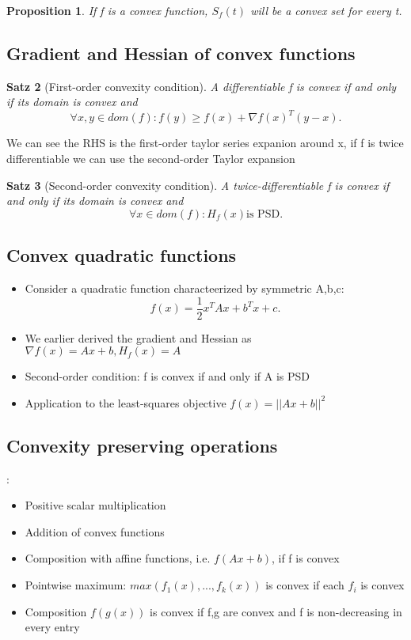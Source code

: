 \documentclass[11pt]{article}
\newtheorem{theorem}{Satz}
\newtheorem{proposition}[theorem]{Proposition}
\begin{document}
\begin{proposition}
    If f is a convex function, $S_f(t)$ will be a convex set for every t. 
\end{proposition}


\subsection*{Gradient and Hessian of convex functions}
\begin{theorem}[First-order convexity condition]
    A differentiable f is convex if and only if its domain is convex and \[
    \forall x,y\in dom(f): f(y)  \geq f(x) + \nabla f(x)^T (y-x)
    .\] 
    
\end{theorem}

We can see the RHS is the first-order taylor series expanion around x, if f is twice differentiable we can use the second-order Taylor expansion

\begin{theorem}[Second-order convexity condition]
    A twice-differentiable f is convex if and only if its domain is convex and \[
    \forall x\in dom(f): H_f(x) \text{is PSD}
    .\] 
    
\end{theorem}

\subsection*{Convex quadratic functions}
\begin{itemize}
    \item Consider a quadratic function characteerized by symmetric A,b,c: \[
    f(x) = \frac{1}{2}x^T Ax + b^Tx + c
    .\] 
    \item We earlier derived the gradient and Hessian as $\nabla f(x) = Ax + b, H_f(x) = A$
    \item Second-order condition: f is convex if and only if A is PSD
    \item Application to the least-squares objective $f(x) = ||Ax+b||^2$  
\end{itemize}

\subsection*{Convexity preserving operations}:
\begin{itemize}
    \item Positive scalar multiplication
    \item Addition of convex functions
    \item Composition with affine functions, i.e. $f(Ax+b)$, if f is convex
    \item Pointwise maximum: $max(f_1(x), ..., f_k(x))$ is convex if each $f_i$ is convex
    \item Composition $f(g(x))$ is convex if f,g are convex and f is non-decreasing in every entry   
\end{itemize}
\end{document}
